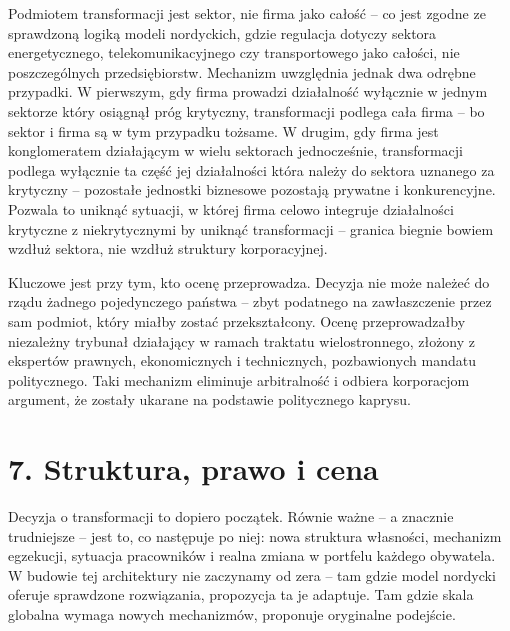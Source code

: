 \documentclass[12pt,a4paper]{article}
\begin{document}
Podmiotem transformacji jest sektor, nie firma jako całość -- co jest
zgodne ze sprawdzoną logiką modeli nordyckich, gdzie regulacja dotyczy
sektora energetycznego, telekomunikacyjnego czy transportowego jako całości,
nie poszczególnych przedsiębiorstw. Mechanizm uwzględnia jednak dwa
odrębne przypadki. W pierwszym, gdy firma prowadzi działalność wyłącznie
w jednym sektorze który osiągnął próg krytyczny, transformacji podlega
cała firma -- bo sektor i firma są w tym przypadku tożsame. W drugim,
gdy firma jest konglomeratem działającym w wielu sektorach jednocześnie,
transformacji podlega wyłącznie ta część jej działalności która należy do
sektora uznanego za krytyczny -- pozostałe jednostki biznesowe pozostają
prywatne i konkurencyjne. Pozwala to uniknąć sytuacji, w której firma
celowo integruje działalności krytyczne z niekrytycznymi by uniknąć
transformacji -- granica biegnie bowiem wzdłuż sektora, nie wzdłuż struktury
korporacyjnej.

Kluczowe jest przy tym, kto ocenę przeprowadza. Decyzja nie może należeć
do rządu żadnego pojedynczego państwa -- zbyt podatnego na zawłaszczenie
przez sam podmiot, który miałby zostać przekształcony. Ocenę przeprowadzałby
niezależny trybunał działający w ramach traktatu wielostronnego, złożony z
ekspertów prawnych, ekonomicznych i technicznych, pozbawionych mandatu
politycznego. Taki mechanizm eliminuje arbitralność i odbiera korporacjom
argument, że zostały ukarane na podstawie politycznego kaprysu.

\section*{7. Struktura, prawo i cena}

Decyzja o transformacji to dopiero początek. Równie ważne -- a znacznie
trudniejsze -- jest to, co następuje po niej: nowa struktura własności,
mechanizm egzekucji, sytuacja pracowników i realna zmiana w portfelu
każdego obywatela. W budowie tej architektury nie zaczynamy od zera --
tam gdzie model nordycki oferuje sprawdzone rozwiązania, propozycja ta
je adaptuje. Tam gdzie skala globalna wymaga nowych mechanizmów,
proponuje oryginalne podejście.
\end{document}

